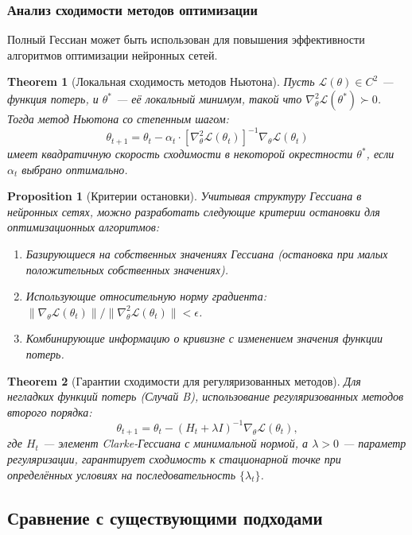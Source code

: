 \documentclass[11pt]{article}
\newtheorem{theorem}{Theorem}
\newtheorem{proposition}{Proposition}
\begin{document}
\subsubsection{Анализ сходимости методов оптимизации}

Полный Гессиан может быть использован для повышения эффективности алгоритмов оптимизации нейронных сетей.

\begin{theorem}[Локальная сходимость методов Ньютона]
  Пусть $\mathcal{L}(\theta) \in C^2$ — функция потерь, и $\theta^*$ — её локальный минимум, такой что
  $\nabla^2_\theta \mathcal{L}(\theta^*) \succ 0$. Тогда метод Ньютона со степенным шагом:
  \[
    \theta_{t+1} = \theta_t - \alpha_t \cdot [\nabla^2_\theta \mathcal{L}(\theta_t)]^{-1} \nabla_\theta
    \mathcal{L}(\theta_t)
  \]
  имеет квадратичную скорость сходимости в некоторой окрестности $\theta^*$, если $\alpha_t$ выбрано оптимально.
\end{theorem}

\begin{proposition}[Критерии остановки]
  Учитывая структуру Гессиана в нейронных сетях, можно разработать следующие критерии остановки для
  оптимизационных алгоритмов:
  \begin{enumerate}
    \item Базирующиеся на собственных значениях Гессиана (остановка при малых положительных собственных значениях).
    \item Использующие относительную норму градиента: $\|\nabla_\theta \mathcal{L}(\theta_t)\| /
      \|\nabla^2_\theta \mathcal{L}(\theta_t)\| < \epsilon$.
    \item Комбинирующие информацию о кривизне с изменением значения функции потерь.
  \end{enumerate}
\end{proposition}

\begin{theorem}[Гарантии сходимости для регуляризованных методов]
  Для негладких функций потерь (Случай B), использование регуляризованных методов второго порядка:
  \[
    \theta_{t+1} = \theta_t - (H_t + \lambda I)^{-1} \nabla_\theta \mathcal{L}(\theta_t),
  \]
  где $H_t$ — элемент Clarke-Гессиана с минимальной нормой, а $\lambda > 0$ — параметр регуляризации,
  гарантирует сходимость к стационарной точке при определённых условиях на последовательность $\{\lambda_t\}$.
\end{theorem}

\subsection{Сравнение с существующими подходами}
\end{document}
